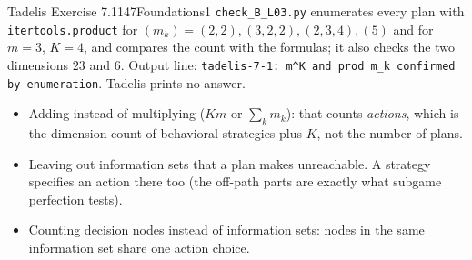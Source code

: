 \begin{exsol}{Tadelis Exercise 7.1}{147}{Foundations}{1}
\verify \texttt{check\_B\_L03.py} enumerates every plan with \texttt{itertools.product} for
$(m_k) = (2,2), (3,2,2), (2,3,4), (5)$ and for $m=3$, $K=4$, and compares the count with the
formulas; it also checks the two dimensions $23$ and $6$. Output line:
\texttt{tadelis-7-1: m\^{}K and prod m\_k confirmed by enumeration}. Tadelis prints no answer.

\mistakes
\begin{itemize}
  \item Adding instead of multiplying ($Km$ or $\sum_k m_k$): that counts \emph{actions}, which
  is the dimension count of behavioral strategies plus $K$, not the number of plans.
  \item Leaving out information sets that a plan makes unreachable. A strategy specifies an
  action there too (the off-path parts are exactly what subgame perfection tests).
  \item Counting decision nodes instead of information sets: nodes in the same information set
  share one action choice.
\end{itemize}

\end{exsol}
